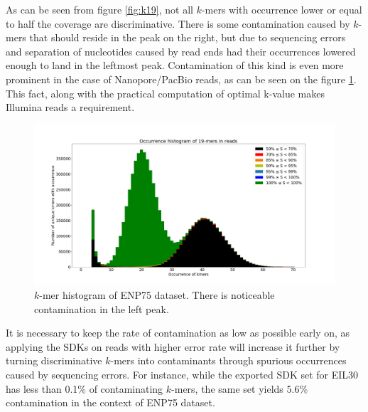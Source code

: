 As can be seen from figure \ref{fig:k19}, not all $k$-mers with occurrence lower or equal to half the coverage are discriminative. There is some contamination caused by $k$-mers that should reside in the peak on the right, but due to sequencing errors and separation of nucleotides caused by read ends had their occurrences lowered enough to land in the leftmost peak. Contamination of this kind is even more prominent in the case of Nanopore/PacBio reads, as can be seen on the figure \ref{fig:nanopore_hist}. This fact, along with the practical computation of optimal k-value makes Illumina reads a requirement.

\begin{figure}
\includegraphics[width=400bp]{figures/nanopore_hist.png}
\caption{$k$-mer histogram of ENP75 dataset. There is noticeable contamination in the left peak.}
\label{fig:nanopore_hist}
\end{figure}

It is necessary to keep the rate of contamination as low as possible early on, as applying the SDKs on reads with higher error rate will increase it further by turning discriminative $k$-mers into contaminants through spurious occurrences caused by sequencing errors. For instance, while the exported SDK set for EIL30 has less than 0.1\% of contaminating $k$-mers, the same set yields 5.6\% contamination in the context of ENP75 dataset.